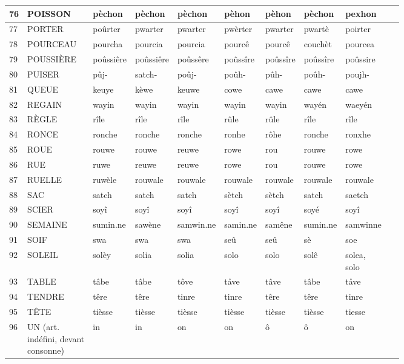 \documentclass[french]{article}
\begin{document}
\begin{landscape}
\begin{longtable}{|l|l|l|l|l|l|l|l||l|l|}
	76 & POISSON & pèchon & pèchon & pèchon & pèhon & pèhon & pèchon & pexhon & ~ \\ \hline
	77 & PORTER & poûrter & pwarter & pwarter & pwèrter & pwarter & pwartè & poirter & ~ \\ \hline
	78 & POURCEAU & pourcha & pourcia & pourcia & pourcê & pourcê & couchèt & pourcea & ~ \\ \hline
	79 & POUSSIÈRE & poûssiêre & poûssiêre & poûssêre & poûssîre & poûssîre & poûssîre & poûssire & ~ \\ \hline
	80 & PUISER & pûj- & satch- & poûj- & poûh- & pûh- & poûh- & poujh- & ~ \\ \hline
	81 & QUEUE & keuye & kèwe & keuwe & cowe & cawe & cawe & cawe & ~ \\ \hline
	82 & REGAIN & wayin & wayin & wayin & wayin & wayin & wayén & waeyén & ~ \\ \hline
	83 & RÈGLE & rîle & rîle & rîle & rûle & rûle & rîle & rîle & ~ \\ \hline
	84 & RONCE & ronche & ronche & ronche & ronhe & rôhe & ronche & ronxhe & ~ \\ \hline
	85 & ROUE & rouwe & rouwe & reuwe & rowe & rou & rouwe & rowe & ~ \\ \hline
	86 & RUE & ruwe & reuwe & reuwe & rowe & rou & rouwe & rowe & ~ \\ \hline
	87 & RUELLE & ruwèle & rouwale & rouwale & rouwale & rouwale & rouwale & rouwale & ~ \\ \hline
	88 & SAC & satch & satch & satch & sètch & sètch & satch & saetch & ~ \\ \hline
	89 & SCIER & soyî & soyî & soyî & soyî & soyî & soyé & soyî & ~ \\ \hline
	90 & SEMAINE & sumin.ne & sawène & samwin.ne & samin.ne & samêne & sumin.ne & samwinne & ~ \\ \hline
	91 & SOIF & swa & swa & swa & seû & seû & sè & soe & ~ \\ \hline
	92 & SOLEIL & solèy & solia & solia & solo & solo & solê & \makecell[l]{solea,\\solo} & ~ \\ \hline
	93 & TABLE & tâbe & tâbe & tôve & tåve & tâve & tâbe & tåve & ~ \\ \hline
	94 & TENDRE & têre & têre & tinre & tinre & têre & têre & tinre & ~ \\ \hline
	95 & TÊTE & tièsse & tièsse & tièsse & tièsse & tièsse & tièsse & tiesse & ~ \\ \hline
	96 & \makecell[l]{UN (art.\\indéfini, devant\\consonne)} & in & in & on & on & ô & ô & on & ~ \\ \hline

\end{longtable}
\end{landscape}
\end{document}
